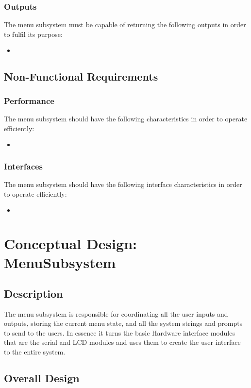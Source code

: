 \documentclass[]{report}
\begin{document}
\subsubsection{Outputs}
The menu subsystem must be capable of returning the following outputs in order to fulfil its purpose:
\begin{itemize}
	\item 
\end{itemize}

\subsection{Non-Functional Requirements}
\subsubsection{Performance}
The menu subsystem should have the following characteristics in order to operate efficiently:
\begin{itemize}
	\item 
\end{itemize}

\subsubsection{Interfaces}
The menu subsystem should have the following interface characteristics in order to operate efficiently:
\begin{itemize}
	\item 
\end{itemize}

\section{Conceptual Design: MenuSubsystem}
\subsection{Description}
The menu subsystem is responsible for coordinating all the user inputs and outputs, storing the current menu state, and all the system strings and prompts to send to the users. In essence it turns the basic Hardware interface modules that are the serial and LCD modules and uses them to create the user interface to the entire system.

\subsection{Overall Design}
\end{document}

